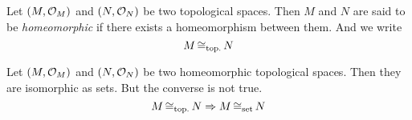 \begin{definition}[Homeomorphic]
	Let \((M, \mathcal{O}_M)\) and \((N, \mathcal{O}_N)\) be two topological spaces. Then \(M\) and \(N\) are said to be \emph{homeomorphic} if there exists a homeomorphism between them. And we write
	\begin{equation}
		M \operatorname{\cong_{\text{top.}}} N \label{eq:homeomorphic}
	\end{equation}
\end{definition}

\begin{remark}
	Let \((M, \mathcal{O}_M)\) and \((N, \mathcal{O}_N)\) be two homeomorphic topological spaces. Then they are isomorphic as sets. But the converse is not true.
	\begin{equation}
		M \operatorname{\cong_{\text{top.}}} N \Rightarrow M \operatorname{\cong_{\text{set}}} N \label{eq:homeomorphic_isomorphic}
	\end{equation}
\end{remark}
